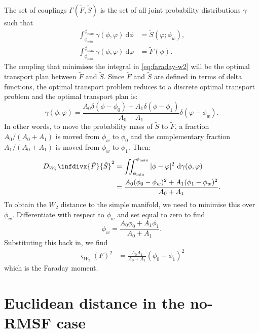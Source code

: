     The set of couplings $\Gamma(\tilde F, \tilde S)$ is the set of all joint probability distributions $\gamma$ such that
    \begin{align}
      \int_{\phi_{\min}}^{\phi_{\max}} \gamma(\phi, \varphi)\ \mathrm{d}\phi &= \tilde S(\varphi; \phi_w),\\
      \int_{\phi_{\min}}^{\phi_{\max}} \gamma(\phi, \varphi)\ \mathrm{d}\varphi &= \tilde F(\phi).
    \end{align}
    The coupling that minimises the integral in \autoref{eq:faraday-w2} will be the optimal transport plan between $\tilde F$ and $\tilde S$. Since $\tilde F$ and $\tilde S$ are defined in terms of delta functions, the optimal transport problem reduces to a discrete optimal transport problem and the optimal transport plan is:
    \begin{equation}
      \gamma(\phi, \varphi) = \frac{A_0 \delta(\phi - \phi_0) + A_1 \delta(\phi - \phi_1)}{A_0 + A_1} \delta(\varphi - \phi_w).
    \end{equation}
    In other words, to move the probability mass of $\tilde S$ to $\tilde F$, a fraction $A_0/(A_0 + A_1)$ is moved from $\phi_w$ to $\phi_0$ and the complementary fraction $A_1/(A_0 + A_1)$ is moved from $\phi_w$ to $\phi_1$. Then:
    \begin{align}
      D_{W_2}\infdivx{\tilde F}{\tilde S}^2 &= \iint_{\phi_{\min}}^{\phi_{\max}} |\phi - \varphi|^2\ \mathrm{d}\gamma(\phi, \varphi)\\
        &= \frac{A_0 (\phi_0 - \phi_w)^2 + A_1 (\phi_1 - \phi_w)^2}{A_0 + A_1}.
    \end{align}
    To obtain the $W_2$ distance to the simple manifold, we need to minimise this over $\phi_w$. Differentiate with respect to $\phi_w$ and set equal to zero to find
    \begin{equation}
      \phi_w = \frac{A_0 \phi_0 + A_1 \phi_1}{A_0 + A_1}.
    \end{equation}
    Substituting this back in, we find
    \begin{align}
      \varsigma_{W_2}(F)^2 &= \frac{A_0 A_1}{A_0 + A_1}(\phi_0 - \phi_1)^2
    \end{align}
    which is the Faraday moment.

\section{Euclidean distance in the no-RMSF case}
\label{sec:faraday-euclidean-calculation}

